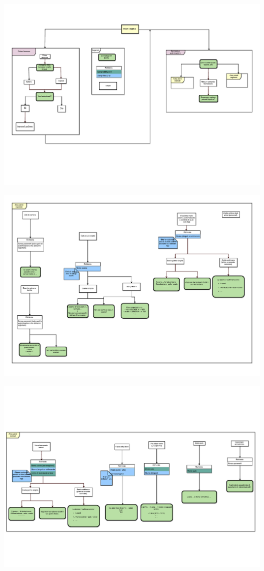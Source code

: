 \documentclass[]{article}
\begin{document}
\pagebreak
\vspace*{-3cm} 
\includegraphics[width=2\textwidth, angle =90 ]{p01}
\thispagestyle{empty}


\vspace*{-3cm}
\hspace*{-2cm} 
\includegraphics[width=2\textwidth, angle =90 ]{p02}
\thispagestyle{empty}


\vspace*{-3cm}
\hspace*{-2cm} 
\includegraphics[width=2\textwidth, angle =90 ]{p03}
\thispagestyle{empty}
\end{document}

